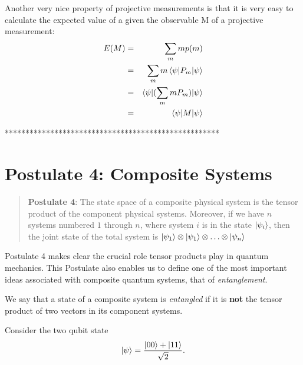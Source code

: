 {Another very nice property of projective measurements is that it is very easy to calculate the expected value of a given the observable M of a projective measurement:
\begin{eqnarray}
E(M)&=&\sum_m mp(m)\\
&=&\sum_m m \braket{\psi|P_m|\psi}\\
&=&\braket{\psi|(\sum_m mP_m)|\psi}\\
&=&\braket{\psi|M|\psi}
\end{eqnarray}

****************************************************
\pagebreak
\section{Postulate 4: Composite Systems}
\begin{quote}
    \textbf{Postulate 4}:  The state space of a composite physical system is the tensor product of the component physical systems. Moreover, if we have $n$ systems numbered $1$ through $n$, where system $i$ is in the state $\ket{\psi_i}$, then the joint state of the total system is $\ket{\psi_1} \otimes \ket{\psi_1} \otimes \hdots \otimes \ket{\psi_n}$
\end{quote}

Postulate 4 makes clear the crucial role tensor products play in quantum mechanics.  This Postulate also enables us to define one of the most important ideas associated with composite quantum systems, that of \textit{entanglement}. 


\begin{definition}\label{definition: entanglement with state vector}
We say that a state of a composite system is \textit{entangled} if it is {\bf{not}} the tensor product of two vectors in its component systems.
\end{definition}


\begin{example}
Consider the two qubit state 
\begin{equation}
    \ket{\psi}=\frac{\ket{00}+\ket{11}}{\sqrt{2}}.
\end{equation}


\end{example}}
